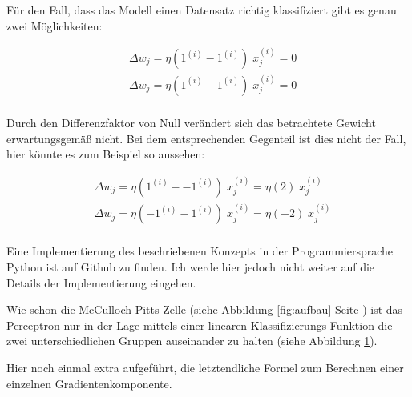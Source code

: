 Für den Fall, dass das Modell einen Datensatz richtig klassifiziert gibt es genau zwei Möglichkeiten:

\begin{equation}
\begin{aligned}
& \Delta w_j = \eta(1^{(i)} - 1^{(i)})\;x^{(i)}_{j} = 0 \\
& \Delta w_j = \eta(1^{(i)} - 1^{(i)})\;x^{(i)}_{j} = 0 \\
\end{aligned}
\end{equation}

Durch den Differenzfaktor von Null verändert sich das betrachtete Gewicht erwartungsgemäß nicht. Bei dem entsprechenden Gegenteil ist dies nicht der Fall, hier könnte es zum Beispiel so aussehen:

\begin{equation}
\begin{aligned}
& \Delta w_j = \eta(1^{(i)} - -1^{(i)})\;x^{(i)}_{j} = \eta(2)\;x^{(i)}_{j} \\
& \Delta w_j = \eta(-1^{(i)} - 1^{(i)})\;x^{(i)}_{j} = \eta(-2)\;x^{(i)}_{j} \\
\end{aligned}
\end{equation}

Eine Implementierung des beschriebenen Konzepts in der Programmiersprache Python ist auf Github \cite{pcImplementierung} zu finden. Ich werde hier jedoch nicht weiter auf die Details der Implementierung eingehen.

Wie schon die McCulloch-Pitts Zelle (siehe Abbildung \ref{fig:aufbau} Seite \pageref{fig:aufbau}) ist das Perceptron nur in der Lage mittels einer linearen Klassifizierungs-Funktion die zwei unterschiedlichen Gruppen auseinander zu halten (siehe Abbildung \ref{fig:probKlassi}).

\FloatBarrier

Hier noch einmal extra aufgeführt, die letztendliche Formel zum Berechnen einer einzelnen Gradientenkomponente.
\begin{figure}[htb!]
  \centering
  \qquad
  \label{fig:probKlassi}
\end{figure}
